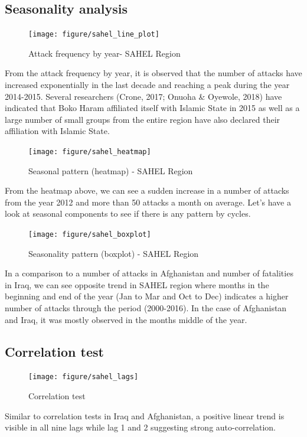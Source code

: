 \documentclass[11pt,oneside,a4paper]{reedthesis}
\begin{document}
\subsection{Seasonality analysis}\label{seasonality-analysis-2}
\begin{figure}
\texttt{[image: figure/sahel\_line\_plot]} \caption{Attack frequency by year- SAHEL Region}\label{fig:unnamed-chunk-104}
\end{figure}
From the attack frequency by year, it is observed that the number of
attacks have increased exponentially in the last decade and reaching a
peak during the year 2014-2015. Several researchers (Crone, 2017; Onuoha
\& Oyewole, 2018) have indicated that Boko Haram affiliated itself with
Islamic State in 2015 as well as a large number of small groups from the
entire region have also declared their affiliation with Islamic State.
\begin{figure}
\texttt{[image: figure/sahel\_heatmap]} \caption{Seasonal pattern (heatmap) - SAHEL Region}\label{fig:unnamed-chunk-105}
\end{figure}
From the heatmap above, we can see a sudden increase in a number of
attacks from the year 2012 and more than 50 attacks a month on average.
Let's have a look at seasonal components to see if there is any pattern
by cycles.
\begin{figure}
\texttt{[image: figure/sahel\_boxplot]} \caption{Seasonality pattern (boxplot) - SAHEL Region}\label{fig:unnamed-chunk-106}
\end{figure}
In a comparison to a number of attacks in Afghanistan and number of
fatalities in Iraq, we can see opposite trend in SAHEL region where
months in the beginning and end of the year (Jan to Mar and Oct to Dec)
indicates a higher number of attacks through the period (2000-2016). In
the case of Afghanistan and Iraq, it was mostly observed in the months
middle of the year.

\subsection{Correlation test}\label{correlation-test-3}
\begin{figure}
\texttt{[image: figure/sahel\_lags]} \caption{Correlation test}\label{fig:unnamed-chunk-107}
\end{figure}
Similar to correlation tests in Iraq and Afghanistan, a positive linear
trend is visible in all nine lags while lag 1 and 2 suggesting strong
auto-correlation.
\end{document}
